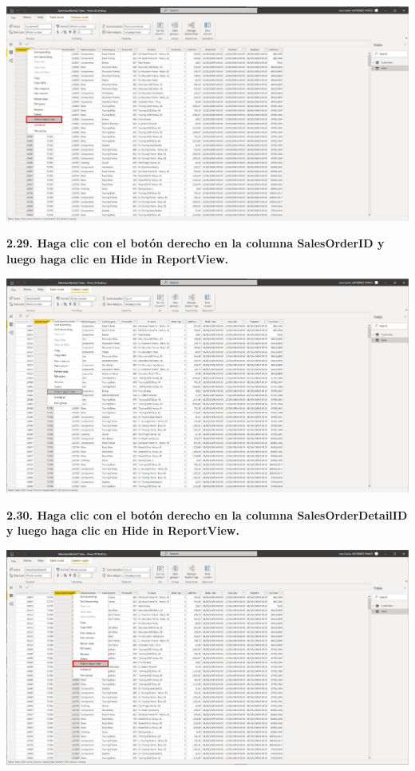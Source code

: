 \documentclass{article}
\begin{document}
    \begin{center}
		\includegraphics[width=14cm]{./images/40} 
	\end{center}
	
\textbf{2.29. Haga clic con el botón derecho en la columna \textbf{SalesOrderID} y luego haga clic en \textbf{Hide in ReportView}.}

    \begin{center}
		\includegraphics[width=14cm]{./images/41} 
	\end{center}
\newpage	
\textbf{2.30. Haga clic con el botón derecho en la columna \textbf{SalesOrderDetailID} y luego haga clic en \textbf{Hide in ReportView}.}

    \begin{center}
		\includegraphics[width=14cm]{./images/42} 
	\end{center}
	
\end{document}
